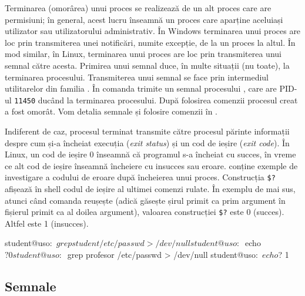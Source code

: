 Terminarea (omorârea) unui proces se realizează de un alt proces care are permisiuni;
în general, acest lucru înseamnă un proces care aparține aceluiași utilizator sau utilizatorului administrativ.
În Windows terminarea unui proces are loc prin transmiterea unei notificări, numite excepție, de la un proces la altul.
În mod similar, în Linux, terminarea unui proces are loc prin transmiterea unui semnal către acesta.
Primirea unui semnal duce, în multe situații (nu toate), la terminarea procesului.
Transmiterea unui semnal se face prin intermediul utilitarelor din familia .
În  comanda  trimite un semnal procesului , care are PID-ul \texttt{11450} ducând la terminarea procesului.
După folosirea comenzii  procesul creat a fost omorât.
Vom detalia semnale și folosire comenzii  în .


Indiferent de caz, procesul terminat transmite către procesul părinte informații despre cum și-a încheiat execuția (\textit{exit status}) și un cod de ieșire (\textit{exit code}).
În Linux, un cod de ieșire 0 înseamnă că programul s-a încheiat cu succes, în vreme ce alt cod de ieșire înseamnă încheiere cu insucces sau eroare.
 conține exemple de investigare a codului de eroare după încheierea unui proces.
Construcția \texttt{\$?} afișează în shell codul de ieșire al ultimei comenzi rulate.
În exemplu de mai sus, atunci când comanda  reușește (adică găsește șirul primit ca prim argument în fișierul primit ca al doilea argument), valoarea construcției \texttt{\$?} este 0 (succes).
Altfel este 1 (insucces).

\begin{screen}[caption={Investigarea codului de ieșire al unui process},label={lst:process:exit-code}]
student@uso:~$ grep student /etc/passwd > /dev/null
student@uso:~$ echo $?
0
student@uso:~$ grep profesor /etc/passwd > /dev/null
student@uso:~$ echo $?
1
\end{screen}

\subsection{Semnale}
\label{sec:process:signal}

